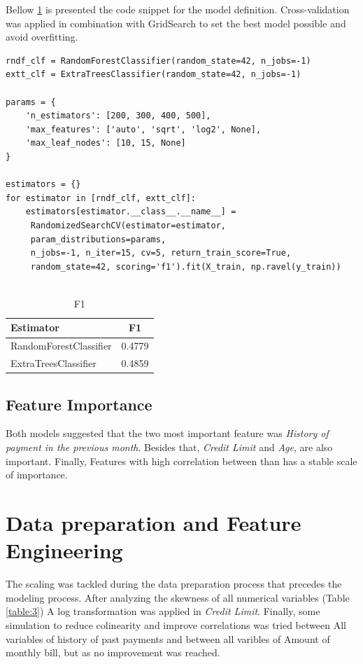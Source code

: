 \documentclass[11pt, a4]{article}
\begin{document}
Bellow \ref{table:4} is presented the code snippet for the model definition. Cross-validation was applied in combination with GridSearch to set the best model possible and avoid overfitting.

\begin{lstlisting}
rndf_clf = RandomForestClassifier(random_state=42, n_jobs=-1)
extt_clf = ExtraTreesClassifier(random_state=42, n_jobs=-1)  

params = {
    'n_estimators': [200, 300, 400, 500],
    'max_features': ['auto', 'sqrt', 'log2', None],
    'max_leaf_nodes': [10, 15, None]
}

estimators = {}
for estimator in [rndf_clf, extt_clf]:
    estimators[estimator.__class__.__name__] =
     RandomizedSearchCV(estimator=estimator, 
     param_distributions=params, 
     n_jobs=-1, n_iter=15, cv=5, return_train_score=True,
     random_state=42, scoring='f1').fit(X_train, np.ravel(y_train))
                                                                    
\end{lstlisting}

\begin{table}[h!]
\centering
\begin{tabular}{l c }
\toprule
\textbf{Estimator} & \textbf{F1} \\
\midrule
RandomForestClassifier & 0.4779\\
ExtraTreesClassifier & 0.4859\\
\bottomrule
\end{tabular}
\caption{F1}
\label{table:4}
\end{table}

\subsection*{Feature Importance}

Both models suggested that the two most important feature was \textit{History of payment in the previous month}. Besides that, \textit{Credit Limit} and \textit{Age}, are also important. Finally, Features with high correlation between than has a stable scale of importance. 

\section*{Data preparation and Feature Engineering}

The scaling was tackled during the data preparation process that precedes the modeling process. After analyzing the skewness of all numerical variables (Table \ref{table:3}) A log transformation was applied in \textit{Credit Limit}. Finally,
some simulation to reduce colinearity and improve correlations was tried between All variables of history of past payments and between all varibles of Amount of monthly bill, but as no improvement was reached. 
\end{document}
